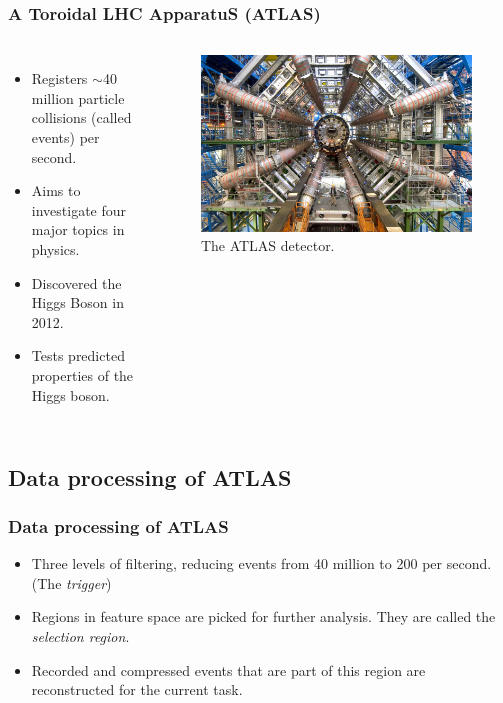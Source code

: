 \begin{frame}
	\frametitle{A Toroidal LHC ApparatuS (ATLAS)}
	\begin{columns}
	\begin{itemize}
		\item Registers $\sim$40 million particle collisions (called events) per second.
		\item Aims to investigate four major topics in physics.
		\item Discovered the Higgs Boson in 2012.
		\item Tests predicted properties of the Higgs boson.
	\end{itemize}
	\begin{figure}
		\includegraphics[width=\linewidth]{images/atlasgross}
		\caption{\raggedleft The ATLAS detector. \cite{atlasHP}}
	\end{figure}
	\end{columns}
\end{frame}

\subsection{Data processing of ATLAS}
\begin{frame}
	\frametitle{Data processing of ATLAS}
	\begin{itemize}
		\item Three levels of filtering, reducing events from 40 million to 200 per second. (The \emph{trigger})
		\item Regions in feature space are picked for further analysis. They are called the \emph{selection region}.
		\item Recorded and compressed events that are part of this region are reconstructed for the current task.
	\end{itemize}
	\begin{flushright}
	\cite{atlasHP}
	\end{flushright}
\end{frame}